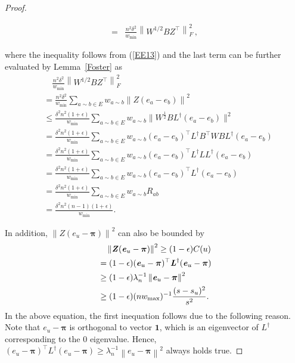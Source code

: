 \documentclass[sigconf]{acmart}
\def\norm#1{\left\| #1 \right\|}
\newcommand\ppi{\boldsymbol{\pi}}
\newcommand\ee{\boldsymbol{\mathit{e}}}
\newcommand\BB{\boldsymbol{\mathit{B}}}
\newcommand\LL{\boldsymbol{\mathit{L}}}
\newcommand\WW{\boldsymbol{\mathit{W}}}
\newcommand\ZZ{\boldsymbol{\mathit{Z}}}
\newcommand{\one}{\mathbf{1}}
\begin{document}
\begin{proof}
\begin{small}
\begin{align*}
			=   & \frac{n^2\delta^{2}}{w_{\min}} \norm{\WW^{1/2} \BB \ZZ^{\top}}_{F}^{2}\,,
		\end{align*}
	\end{small}
	where the  inequality follows from (\ref{EE13}) and the last term can be further evaluated by Lemma~\ref {Foster} as
	\begin{align*}
		 & \quad \frac{n^2\delta^2}{w_{\min}} \norm{\WW^{1/2} \BB \ZZ^{\top}}_{F}^{2}                                 \\
		 & =\frac{n^2\delta^{2}}{w_{\min}}
		\sum_{a\sim b \in E} w_{a\sim b} \norm{\ZZ (\ee_{a} - \ee_{b})}^{2}                                           \\
		 & \leq
		\frac{\delta^{2}n^2 (1+\epsilon)}{w_{\min}}
		\sum_{a\sim b \in E} w_{a\sim b}\|\WW^{\frac{1}{2}} \BB \LL^{\dagger} (\ee_a-\ee_b)\|^2                       \\
		 & =
		\frac{\delta^{2}n^2 (1+\epsilon)}{w_{\min}}
		\sum_{a\sim b \in E} w_{a\sim b}(\ee_a-\ee_b)^\top \LL^{\dagger} \BB^\top \WW \BB \LL^{\dagger} (\ee_a-\ee_b) \\
		 & =
		\frac{\delta^{2}n^2 (1+\epsilon)}{w_{\min}}
		\sum_{a\sim b \in E} w_{a\sim b}(\ee_a-\ee_b)^\top \LL^{\dagger} \LL \LL^{\dagger} (\ee_a-\ee_b)              \\
		 & =
		\frac{\delta^{2}n^2 (1+\epsilon)}{w_{\min}}
		\sum_{a\sim b \in E} w_{a\sim b}(\ee_a-\ee_b)^\top \LL^{\dagger} (\ee_a-\ee_b)                                \\
		 & =
		\frac{\delta^{2} n^2 (1+\epsilon)}{w_{\min}}
		\sum_{a\sim b \in E} w_{a\sim b} R_{ab}                                                                       \\
		 & =\frac{\delta^{2} n^2(n-1) (1+\epsilon)}{w_{\min}}.
	\end{align*}


	In addition, $\norm{\ZZ (\ee_u - \ppi)}^2$ can also be bounded by
	\begin{equation}\label{EE17}
		\begin{split}  \notag
			&\quad\norm{\ZZ (\ee_u - \ppi)}^2
			\geq
			(1 - \epsilon) C(u) \\
			&=(1-\epsilon)(\ee_u-\ppi)^{\top} \LL^{\dagger} (\ee_u-\ppi) \\
			&\geq (1-\epsilon)\lambda_{n}^{-1} \norm{\ee_u-\ppi}^2 \\
			&	\geq (1-\epsilon)(n w_{\max})^{-1} \frac{(s-s_u)^2}{s^2}.
		\end{split}
	\end{equation}
	In the above equation, the first inequation follows due to the following reason.   Note that $\ee_u-\ppi$ is orthogonal to  vector $\one$, which is an eigenvector of $\LL^{\dagger}$ corresponding to the $0$ eigenvalue. Hence, $(\ee_u-\ppi)^{\top} \LL^{\dagger} (\ee_u-\ppi) \ge \lambda_{n}^{-1} \norm{\ee_u-\ppi}^2$ always holds true.


\end{proof}
\end{document}
